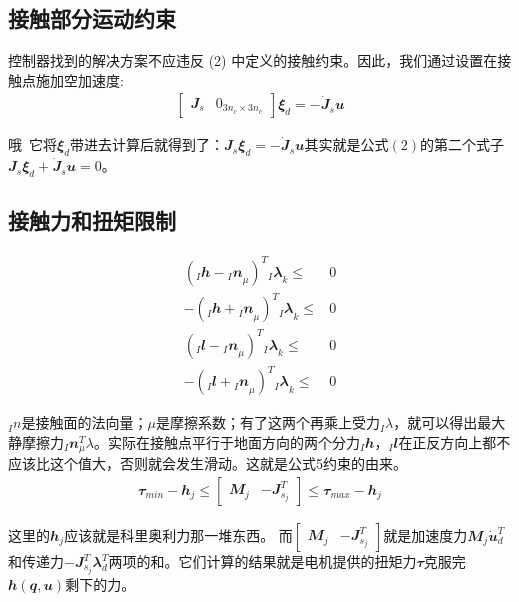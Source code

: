 \subsection{接触部分运动约束}
控制器找到的解决方案不应违反 (2) 中定义的接触约束。因此，我们通过设置在接触点施加空加速度:
\begin{align}
    \begin{bmatrix} {\mathbfit J}_s & {\mathbfit 0}_{3n_c \times 3n_c}\end{bmatrix} {\mathbfit \xi}_d = - \dot {\mathbfit J}_s {\mathbfit u} 
\end{align}

哦~它将${\mathbfit \xi}_d$带进去计算后就得到了：${\mathbfit J}_s  {\mathbfit \xi}_d  = - \dot {\mathbfit J}_s {\mathbfit u}$其实就是公式$(2)$的第二个式子${\mathbfit J}_s  {\mathbfit \xi}_d  + \dot {\mathbfit J}_s {\mathbfit u} = 0$。

\subsection{接触力和扭矩限制}

\begin{align}
(_I{\mathbfit h} - {_I{\mathbfit n}}_{\mu})^T {_I{\mathbfit \lambda}}_k\leq & 0 \\
- (_I{\mathbfit h} + {_I{\mathbfit n}}_{\mu})^T {_I{\mathbfit \lambda}}_k\leq & 0 \\
(_I{\mathbfit l} - {_I{\mathbfit n}}_{\mu})^T {_I{\mathbfit \lambda}}_k\leq & 0 \\
- (_I{\mathbfit l} + {_I{\mathbfit n}}_{\mu})^T {_I{\mathbfit \lambda}}_k\leq & 0
\end{align}

$_In$是接触面的法向量；$\mu$是摩擦系数；有了这两个再乘上受力$_I\lambda$，就可以得出最大静摩擦力$_I{\mathbfit n}_{\mu}^T \lambda$。实际在接触点平行于地面方向的两个分力$_I{\mathbfit h}$，$_I{\mathbfit l}$在正反方向上都不应该比这个值大，否则就会发生滑动。这就是公式5约束的由来。
\begin{align}
    {\mathbfit \tau}_{min}-{\mathbfit h}_j 
    \leq \begin{bmatrix} {\mathbfit M}_j & -{\mathbfit J}^T_{s_j} \end{bmatrix} 
    \leq {\mathbfit \tau}_{max}-{\mathbfit h}_j 
\end{align}

这里的${\mathbfit h}_j$应该就是科里奥利力那一堆东西。
而$\begin{bmatrix} {\mathbfit M}_j & -{\mathbfit J}^T_{s_j} \end{bmatrix}$就是加速度力${\mathbfit M}_j  \dot{\mathbfit u}_d^T$和传递力$-{\mathbfit J}^T_{s_j} {\mathbfit \lambda}_d^T$两项的和。它们计算的结果就是电机提供的扭矩力${\mathbfit \tau}$克服完${\mathbfit h}({\mathbfit q}, {\mathbfit u})$剩下的力。


